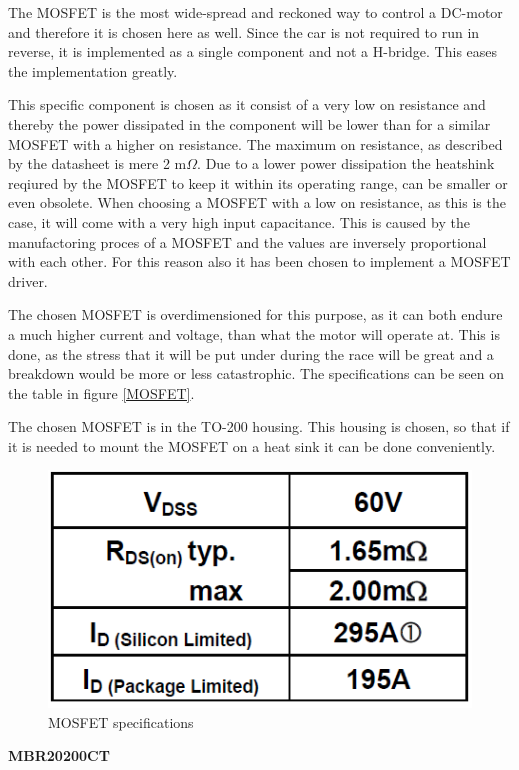 The MOSFET is the most wide-spread and reckoned way to control a DC-motor and therefore it is chosen here as well. Since the car is not required to run in reverse, it is implemented as a single component and not a H-bridge. This eases the implementation greatly.

This specific component is chosen as it consist of a very low on resistance and thereby the power dissipated in the component will be lower than for a similar MOSFET with a higher on resistance. The maximum on resistance, as described by the datasheet is mere 2 m$\Omega$. Due to a lower power dissipation the heatshink reqiured by the MOSFET to keep it within its operating range, can be smaller or even obsolete. When choosing a MOSFET with a low on resistance, as this is the case, it will come with a very high input capacitance. This is caused by the manufactoring proces of a MOSFET and the values are inversely proportional with each other. For this reason also it has been chosen to implement a MOSFET driver. 

The chosen MOSFET is overdimensioned for this purpose, as it can both endure a much higher current and voltage, than what the motor will operate at. This is done, as the stress that it will be put under during the race will be great and a breakdown would be more or less catastrophic. The specifications can be seen on the table in figure \vref{MOSFET}. 

The chosen MOSFET is in the TO-200 housing. This housing is chosen, so that if it is needed to mount the MOSFET on a heat sink it can be done conveniently.  

\begin{figure}[H]
	\centering
	\includegraphics[width=0.85\linewidth]{Hardware/Pictures/MOSFET}
	\caption{MOSFET specifications}
	\label{fig:MOSFET}
\end{figure}

\textbf{MBR20200CT} 

